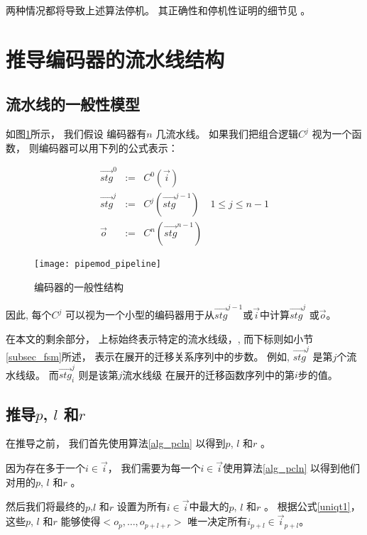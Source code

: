 两种情况都将导致上述算法停机。
其正确性和停机性证明的细节见\cite{ShenTCAD11} 。



\section{推导编码器的流水线结构}\label{sec_pipeinfer}

\subsection{流水线的一般性模型}
如图\ref{fig_pipeenc}所示，
我们假设
编码器有$n$ 几流水线。
如果我们把组合逻辑$C^j$ 视为一个函数，
则编码器可以用下列的公式表示：

\begin{equation}\label{equ_genpipe}
\begin{array}{cccc}
\vec{stg}^0   & := & C^0(\vec{i})         &\\
\vec{stg}^j   & := & C^j(\vec{stg}^{j-1}) & 1\le j\le n-1\\
\vec{o}       & := & C^n(\vec{stg}^{n-1}) &
\end{array}
\end{equation}


\begin{figure}[b]
\begin{center}
\texttt{[image: pipemod\_pipeline]}
\end{center}
\caption{编码器的一般性结构}
  \label{fig_pipeenc}
\end{figure}


因此,
每个$C^j$ 可以视为一个小型的编码器用于从$\vec{stg}^{j-1}$或$\vec{i}$中计算$\vec{stg}^j$ 或$\vec{o}$。


在本文的剩余部分，
上标始终表示特定的流水线级，,
而下标则如小节\ref{subsec_fsm}所述，
表示在展开的迁移关系序列中的步数。
例如,
$\vec{stg}^j$ 是第$j$个流水线级。
而$\vec{stg}^j_i$ 则是该第$j$流水线级
在展开的迁移函数序列中的第$i$步的值。

\subsection{推导$p$, $l$ 和$r$}\label{subsec_inferplr}
在推导之前，
我们首先使用算法\ref{alg_pcln} 以得到$p$, $l$ 和$r$ 。

因为存在多于一个$i\in \vec{i}$，
我们需要为每一个$i\in \vec{i}$使用算法\ref{alg_pcln}
以得到他们对用的$p$, $l$ 和$r$ 。

然后我们将最终的$p$,$l$ 和$r$ 设置为所有$i\in \vec{i}$中最大的$p$, $l$ 和$r$ 。
根据公式\ref{uniqt1}，
这些$p$, $l$ 和$r$ 能够使得$<o_{p},\dots,o_{p+l+r}>$ 唯一决定所有$i_{p+l}\in \vec{i}_{p+l}$。


